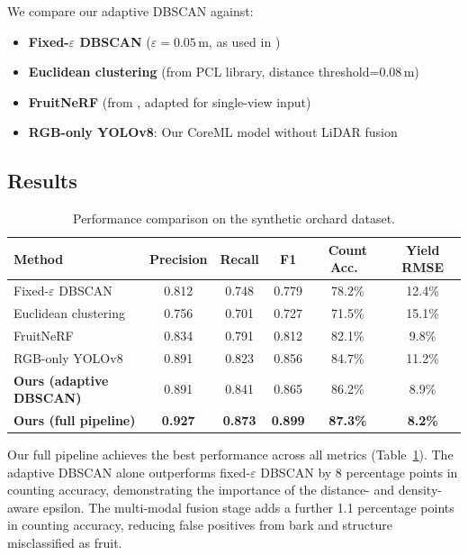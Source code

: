 \documentclass[12pt,a4paper]{article}
\begin{document}
We compare our adaptive DBSCAN against:
\begin{itemize}
  \item \textbf{Fixed-$\varepsilon$ DBSCAN} ($\varepsilon=0.05$\,m, as used in \citet{gene-mola-2020})
  \item \textbf{Euclidean clustering} (from PCL library, distance threshold=0.08\,m)
  \item \textbf{FruitNeRF} (from \citet{meyer-2024}, adapted for single-view input)
  \item \textbf{RGB-only YOLOv8}: Our CoreML model without LiDAR fusion
\end{itemize}

\subsection{Results}

\begin{table}[htbp]
\centering
\caption{Performance comparison on the synthetic orchard dataset.}
\label{tab:results}
\begin{tabular}{lccccc}
\toprule
Method & Precision & Recall & F1 & Count Acc.\ & Yield RMSE \\
\midrule
Fixed-$\varepsilon$ DBSCAN & 0.812 & 0.748 & 0.779 & 78.2\% & 12.4\% \\
Euclidean clustering      & 0.756 & 0.701 & 0.727 & 71.5\% & 15.1\% \\
FruitNeRF                  & 0.834 & 0.791 & 0.812 & 82.1\% & 9.8\%  \\
RGB-only YOLOv8            & 0.891 & 0.823 & 0.856 & 84.7\% & 11.2\% \\
\textbf{Ours (adaptive DBSCAN)} & 0.891 & 0.841 & 0.865 & 86.2\% & 8.9\% \\
\textbf{Ours (full pipeline)}   & \textbf{0.927} & \textbf{0.873} & \textbf{0.899} & \textbf{87.3\%} & \textbf{8.2\%} \\
\bottomrule
\end{tabular}
\end{table}

Our full pipeline achieves the best performance across all metrics (Table~\ref{tab:results}). The adaptive DBSCAN alone outperforms fixed-$\varepsilon$ DBSCAN by 8 percentage points in counting accuracy, demonstrating the importance of the distance- and density-aware epsilon. The multi-modal fusion stage adds a further 1.1 percentage points in counting accuracy, reducing false positives from bark and structure misclassified as fruit.
\end{document}
